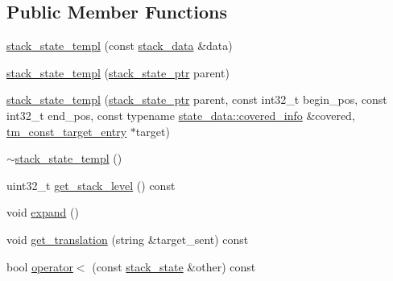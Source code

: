 \subsection*{Public Member Functions}
\begin{DoxyCompactItemize}
\item 
\hyperlink{classuva_1_1smt_1_1bpbd_1_1server_1_1decoder_1_1stack_1_1stack__state__templ_a005011d53139b99aff4120ae286b874c}{stack\+\_\+state\+\_\+templ} (const \hyperlink{structuva_1_1smt_1_1bpbd_1_1server_1_1decoder_1_1stack_1_1stack__data}{stack\+\_\+data} \&data)
\item 
\hyperlink{classuva_1_1smt_1_1bpbd_1_1server_1_1decoder_1_1stack_1_1stack__state__templ_a6896e03ca2bf862e3744ffbf121835d0}{stack\+\_\+state\+\_\+templ} (\hyperlink{namespaceuva_1_1smt_1_1bpbd_1_1server_1_1decoder_1_1stack_ab08047a5fae45b1c4311bd5d5aa2c4fc}{stack\+\_\+state\+\_\+ptr} parent)
\item 
\hyperlink{classuva_1_1smt_1_1bpbd_1_1server_1_1decoder_1_1stack_1_1stack__state__templ_aa4428a7bd21dc116d198f2b5e89a6533}{stack\+\_\+state\+\_\+templ} (\hyperlink{namespaceuva_1_1smt_1_1bpbd_1_1server_1_1decoder_1_1stack_ab08047a5fae45b1c4311bd5d5aa2c4fc}{stack\+\_\+state\+\_\+ptr} parent, const int32\+\_\+t begin\+\_\+pos, const int32\+\_\+t end\+\_\+pos, const typename \hyperlink{structuva_1_1smt_1_1bpbd_1_1server_1_1decoder_1_1stack_1_1state__data__templ_a1fca0516a4ceb05fe35ea64a0b354d8a}{state\+\_\+data\+::covered\+\_\+info} \&covered, \hyperlink{namespaceuva_1_1smt_1_1bpbd_1_1server_1_1tm_1_1models_ae043b2a8672e39fe61239f7f1ece86ab}{tm\+\_\+const\+\_\+target\+\_\+entry} $\ast$target)
\item 
\hyperlink{classuva_1_1smt_1_1bpbd_1_1server_1_1decoder_1_1stack_1_1stack__state__templ_aa08928ff7a2109f156e59e1628fed200}{$\sim$stack\+\_\+state\+\_\+templ} ()
\item 
uint32\+\_\+t \hyperlink{classuva_1_1smt_1_1bpbd_1_1server_1_1decoder_1_1stack_1_1stack__state__templ_a2be186b492ab2414d085b587d44516bc}{get\+\_\+stack\+\_\+level} () const 
\item 
void \hyperlink{classuva_1_1smt_1_1bpbd_1_1server_1_1decoder_1_1stack_1_1stack__state__templ_ab97b051b5008f17771b7a78c5bc62c94}{expand} ()
\item 
void \hyperlink{classuva_1_1smt_1_1bpbd_1_1server_1_1decoder_1_1stack_1_1stack__state__templ_afbd2ab8ae39e90acbd917e5c4006cfaa}{get\+\_\+translation} (string \&target\+\_\+sent) const 
\item 
bool \hyperlink{classuva_1_1smt_1_1bpbd_1_1server_1_1decoder_1_1stack_1_1stack__state__templ_a85cbb6b3b3e0f14bfdb124f3c92da554}{operator$<$} (const \hyperlink{namespaceuva_1_1smt_1_1bpbd_1_1server_1_1decoder_1_1stack_a30416dfcace69691af43f9f44a076f7e}{stack\+\_\+state} \&other) const 

\end{DoxyCompactItemize}

